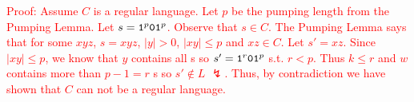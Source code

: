 \textcolor{red}{
    Proof: Assume $C$ is a regular language. Let $p$ be the pumping length from the Pumping Lemma. Let $s = \texttt{1}^p\texttt{01}^p$. Observe that $s \in C$. The Pumping Lemma says that for some $xyz$, $s=xyz$, $|y| > 0$, $|xy| \leq p$ and $xz \in C$. Let $s' = xz$. Since $|xy| \leq p$, we know that $y$ contains all s so $s' = \texttt{1}^r\texttt{01}^p$ s.t. $r < p$. Thus $k \leq r$ and $w$ contains more than $p-1=r$ s so $s' \notin L$ $\lightning$. Thus, by contradiction we have shown that $C$ can not be a regular language.
}